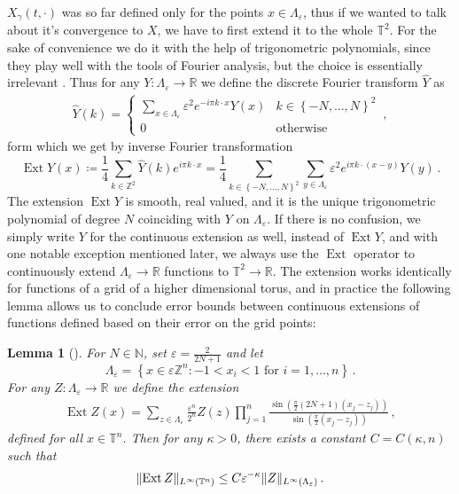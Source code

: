 \documentclass{report}
\newcommand{\ZZ}{\mathbb{Z}}
\newcommand{\NN}{\mathbb{N}}
\newcommand{\RR}{\mathbb{R}}
\newcommand{\TT}{\mathbb{T}}
\DeclarePairedDelimiter\norm{\lVert}{\rVert}%
\DeclareMathOperator{\DefiningEquality}{\coloneqq}
\DeclareMathOperator{\Ext}{Ext}
\newtheorem{lemma}[theorem]{Lemma}
\theoremstyle{remark}
\theoremstyle{definition}
\newcommand{\TODO}[1]{\text{\textcolor{red}{TODO: #1}}\xspace}
\let\epsilon\varepsilon
\begin{document}
$X_\gamma(t, \cdot)$ was so far defined only for the points $x \in \Lambda_\epsilon$, thus if we wanted to talk about it's convergence to $X$, we have to first extend it to the whole $\TT^2$. For the sake of convenience we do it with the help of trigonometric polynomials, since they play well with the tools of Fourier analysis, but the choice is essentially irrelevant \cite{mourrat2015convergencetwodimensionaldynamicisingkac}. Thus for any $Y: \Lambda_\epsilon \to \RR$ we define the discrete Fourier transform $\hat{Y}$ as \begin{align}
  \hat{Y}(k) = \begin{cases}
      \sum_{x \in \Lambda_\epsilon} \epsilon^2 e^{- i \pi k \cdot x} Y(x)&k \in \left\{-N, \ldots, N\right\}^2\\
      0&\text{otherwise}
  \end{cases}\,,
\end{align}
form which we get by inverse Fourier transformation $$\Ext Y(x) \DefiningEquality \frac{1}{4} \sum_{k \in \ZZ^2} \hat{Y}(k) e^{i \pi k \cdot x} = \frac{1}{4} \sum_{k \in \left\{-N, \dots, N\right\}^2} \sum_{y \in \Lambda_\epsilon}\epsilon^2 e^{i \pi k \cdot (x -y)} Y(y)\,.$$
The extension $\Ext Y$ is smooth, real valued, and it is the unique trigonometric polynomial of degree $N$ coinciding with $Y$ on $\Lambda_\epsilon$. If there is no confusion, we simply write $Y$ for the continuous extension as well, instead of $\Ext{Y}$, and with one notable exception mentioned later, we always use the $\Ext$ operator to continuously extend $\Lambda_\epsilon \to \RR$ functions to $\TT^2 \to \RR$. The extension works identically for functions of a grid of a higher dimensional torus, and in practice the following lemma allows us to conclude error bounds between continuous extensions of functions defined based on their error on the grid points:

\begin{lemma}[{\cite[Lemma A.6]{mourrat2015convergencetwodimensionaldynamicisingkac}}]
  \label{lemma:A6}
  For $N \in \NN$, set $\epsilon = \frac{2}{2N + 1}$ and let $$\Lambda_\epsilon = \left\{x \in \epsilon \ZZ^n: -1 < x_i < 1 \text{ for } i = 1, \ldots, n\right\}\,.$$ For any $Z: \Lambda_\epsilon \to \RR$ we define the extension\begin{align*}
    \Ext{Z}(x) = \sum_{z \in \Lambda_\epsilon}\frac{\epsilon^n}{2^n}Z(z) \prod_{j=1}^n \frac{\sin\left(\frac{\pi}{2}(2N + 1)(x_j - z_j)\right)}{\sin(\frac{\pi}{2}(x_j - z_j))}\,,
  \end{align*}
  defined for all $x \in \TT^n$. Then for any $\kappa > 0$, there exists a constant $C = C(\kappa, n)$ such that
  \begin{align*}
    \norm{\Ext{Z}}_{L^\infty(\TT^n)} \le C \epsilon^{-\kappa} \norm{Z}_{L^\infty(\Lambda_\epsilon)}\,.
  \end{align*}
\end{lemma}
\end{document}
